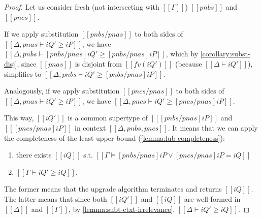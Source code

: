 \lemmaUpgradeCompleteness*
\begin{proof}
    Let us consider fresh (not intersecting with $[[Γ]]$) $[[pnbs]]$ and $[[pncs]]$.

    If we apply substitution $[[pnbs/pnas]]$ to both sides of $[[Δ, pnas ⊢ iQ' ≥ iP]]$,
    we have $[[Δ, pnbs ⊢ [pnbs/pnas]iQ' ≥ [pnbs/pnas]iP]]$, which by  
    \cref{corollary:subst-disj}, since $[[pnas]]$ is disjoint from $[[fv(iQ')]]$
    (because $[[Δ ⊢ iQ']]$), simplifies to $[[Δ, pnbs ⊢ iQ' ≥ [pnbs/pnas]iP]]$.

    Analogously, if we apply substitution $[[pncs/pnas]]$ to both sides of $[[Δ, pnas ⊢ iQ' ≥ iP]]$,
    we have $[[Δ, pncs ⊢ iQ' ≥ [pncs/pnas]iP]]$.

    This way, $[[iQ']]$ is a common supertype of $[[ [pnbs/pnas]iP ]]$ and $[[ [pncs/pnas]iP ]]$ in
    context $[[Δ, pnbs, pncs]]$. It means that we can apply the completeness of the least upper bound
    (\cref{lemma:lub-completeness}):
    \begin{enumerate}
        \item there exists $[[iQ]]$ s.t. $[[Γ ⊨ [pnbs/pnas]iP ∨ [pncs/pnas]iP = iQ]]$ 
        \item $[[Γ ⊢ iQ' ≥ iQ]]$.
    \end{enumerate}
    The former means that the upgrade algorithm terminates and returns $[[iQ]]$.
    The latter means that since both 
    $[[iQ']]$ and $[[iQ]]$ are well-formed in $[[Δ]]$ and $[[Γ]]$,
    by \cref{lemma:subt-ctxt-irrelevance}, $[[Δ ⊢ iQ' ≥ iQ]]$.
\end{proof}


